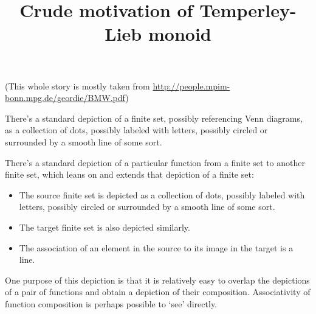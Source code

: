 \documentclass[11pt,noamsfonts]{amsart}
\title{Crude motivation of Temperley-Lieb monoid}
\begin{document}
\maketitle

(This whole story is mostly taken from \url{http://people.mpim-bonn.mpg.de/geordie/BMW.pdf})

There's a standard depiction of a finite set, possibly referencing Venn diagrams,
as a collection of dots, possibly labeled with letters, possibly circled or surrounded by a smooth line of some sort.


There's a standard depiction of a particular function from a finite set to another finite set, which leans on and extends that depiction of a finite set:
\begin{itemize}
\item The source finite set is depicted as a collection of dots, possibly labeled with letters,
possibly circled or surrounded by a smooth line of some sort.
\item The target finite set is also depicted similarly.
\item The association of an element in the source to its image in the target is a line.
\end{itemize}

One purpose of this depiction is that it is relatively easy to overlap the depictions of
a pair of functions and obtain a depiction of their composition. Associativity of function composition is perhaps possible to `see' directly.

\end{document}
